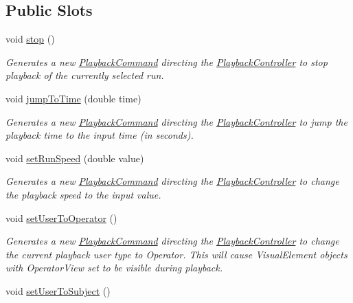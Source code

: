 \subsection*{Public Slots}
\begin{DoxyCompactItemize}
\item 
\hypertarget{class_playback_controller_a15d048af021ac2b4d66e90b5a96c2c3e}{void \hyperlink{class_playback_controller_a15d048af021ac2b4d66e90b5a96c2c3e}{stop} ()}\label{class_playback_controller_a15d048af021ac2b4d66e90b5a96c2c3e}

\begin{DoxyCompactList}\small\item\em Generates a new \hyperlink{struct_playback_command}{Playback\-Command} directing the \hyperlink{class_playback_controller}{Playback\-Controller} to stop playback of the currently selected run. \end{DoxyCompactList}\item 
void \hyperlink{class_playback_controller_a5c751dc9c22b95f6f601380f503f8f9c}{jump\-To\-Time} (double time)
\begin{DoxyCompactList}\small\item\em Generates a new \hyperlink{struct_playback_command}{Playback\-Command} directing the \hyperlink{class_playback_controller}{Playback\-Controller} to jump the playback time to the input time (in seconds). \end{DoxyCompactList}\item 
void \hyperlink{class_playback_controller_a1fae46deb4de91c060c654e96a885581}{set\-Run\-Speed} (double value)
\begin{DoxyCompactList}\small\item\em Generates a new \hyperlink{struct_playback_command}{Playback\-Command} directing the \hyperlink{class_playback_controller}{Playback\-Controller} to change the playback speed to the input value. \end{DoxyCompactList}\item 
\hypertarget{class_playback_controller_ac742d84bf766c1ac21093c5f4bdb3816}{void \hyperlink{class_playback_controller_ac742d84bf766c1ac21093c5f4bdb3816}{set\-User\-To\-Operator} ()}\label{class_playback_controller_ac742d84bf766c1ac21093c5f4bdb3816}

\begin{DoxyCompactList}\small\item\em Generates a new \hyperlink{struct_playback_command}{Playback\-Command} directing the \hyperlink{class_playback_controller}{Playback\-Controller} to change the current playback user type to Operator. This will cause Visual\-Element objects with Operator\-View set to be visible during playback. \end{DoxyCompactList}\item 
\hypertarget{class_playback_controller_a99f12830359eb66a251ac0b2d0b29f42}{void \hyperlink{class_playback_controller_a99f12830359eb66a251ac0b2d0b29f42}{set\-User\-To\-Subject} ()}\label{class_playback_controller_a99f12830359eb66a251ac0b2d0b29f42}


\end{DoxyCompactItemize}
